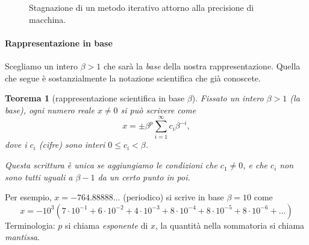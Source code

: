 \documentclass[a4paper]{report}
\newtheorem{theorem}{Teorema}[chapter]
\theoremstyle{definiton}
\theoremstyle{remark}
\begin{document}
\begin{figure}
\begin{center}
        \end{center}
    \caption{Stagnazione di un metodo iterativo attorno alla precisione di macchina.} \label{fig:iterativi2}
    \end{figure}    

\paragraph{Rappresentazione in base}

Scegliamo un intero $\beta > 1$ che sarà la \emph{base} della nostra rappresentazione. Quella che segue è sostanzialmente la notazione scientifica che già conoscete.
\begin{theorem}[rappresentazione scientifica in base $\beta$]
Fissato un intero $\beta > 1$ (la \emph{base}), ogni numero reale $x\neq 0$ si può scrivere come
\begin{equation} \label{rapprbase}
    x = \pm \beta^p \sum_{i=1}^\infty c_i \beta^{-i},   
\end{equation}
dove i $c_i$ (\emph{cifre}) sono interi $0 \leq c_i < \beta$.

Questa scrittura è unica se aggiungiamo le condizioni che $c_1 \neq 0$, e che $c_i$ non sono tutti uguali a $\beta-1$ da un certo punto in poi.
\end{theorem}
Per esempio, $x = -764.88888\dots$ (periodico) si scrive in base $\beta=10$ come
\[
x = - 10^3 (7\cdot 10^{-1} + 6\cdot 10^{-2} + 4\cdot 10^{-3} + 8 \cdot 10^{-4} + 8 \cdot 10^{-5} + 8 \cdot 10^{-6} + \dots)
\]
Terminologia: $p$ si chiama \emph{esponente} di $x$, la quantità nella sommatoria si chiama \emph{mantissa}.
\end{document}
